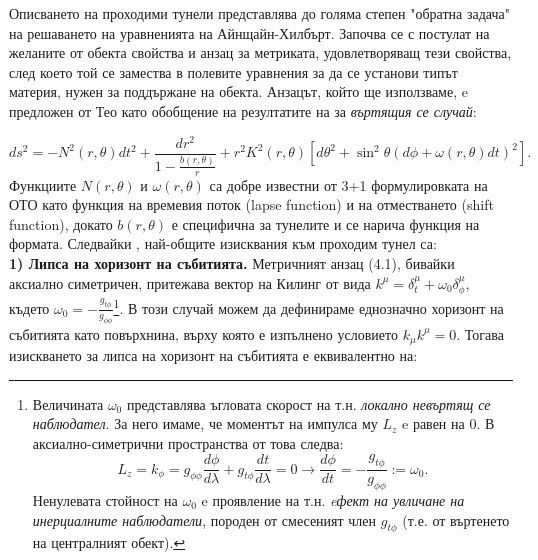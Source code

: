 Описването на проходими тунели представлява до голяма степен "обратна задача"$\,$ на решаването на уравненията на Айнщайн-Хилбърт. Започва се с постулат на желаните от обекта свойства и анзац за метриката, удовлетворяващ тези свойства, след което той се замества в полевите уравнения за да се установи типът материя, нужен за поддържане на обекта. Анзацът, който ще използваме, e предложен от Тео \cite{Teo} като обобщение на резултатите на \cite{Morris1988} за \emph{въртящия се случай}:
	
\begin{equation}
	ds^2 = -N^2(r,\theta)dt^2 + \frac{dr^2}{1 - \frac{b(r,\theta)}{r}} + r^2K^2(r,\theta)\left[d\theta^2 + \sin^2\theta\left(d\phi + \omega(r,\theta)dt\right)^2\right].
\end{equation}
Функциите $N(r,\theta)$ и $\omega(r,\theta)$ са добре известни от 3+1 формулировката на ОТО като функция на времевия поток (lapse function) и на отместването (shift function), докато $b(r,\theta)$ е специфична за тунелите и се нарича функция на формата. Следвайки \cite{Morris1988}, най-общите изисквания към проходим тунел са:\\

\noindent\textbf{1) Липса на хоризонт на събитията.} Метричният анзац (4.1), бивайки аксиално симетричен, притежава вектор на Килинг от вида $k^\mu = \delta_t^\mu + \omega_0\delta^\mu_\phi$, където $\omega_0 = -\frac{g_{t\phi}}{g_{\phi\phi}}$\footnote{Величината $\omega_0$ представлява ъгловата скорост на т.н. \emph{локално невъртящ се наблюдател}. За него имаме, че моментът на импулса му $L_z$ e равен на 0. В аксиално-симетрични пространства от това следва:
	\begin{equation*}
		L_z = k_\phi = g_{\phi\phi}\frac{d\phi}{d\lambda} + g_{t\phi}\frac{dt}{d\lambda} = 0\rightarrow \frac{d\phi}{dt} = -\frac{g_{t\phi}}{g_{\phi\phi}} := \omega_0.
	\end{equation*}
	Ненулевата стойност на $\omega_0$ e проявление на т.н. \emph{eфект на увличане на инерциалните наблюдатели}, породен от смесеният член $g_{t\phi}$ (т.е. от въртенето на централният обект).}. В този случай можем да дефинираме еднозначно хоризонт на събитията като повърхнина, върху която е изпълнено условието $k_\mu k^\mu = 0$. Тогава изискването за липса на хоризонт на събитията е еквивалентно на:

